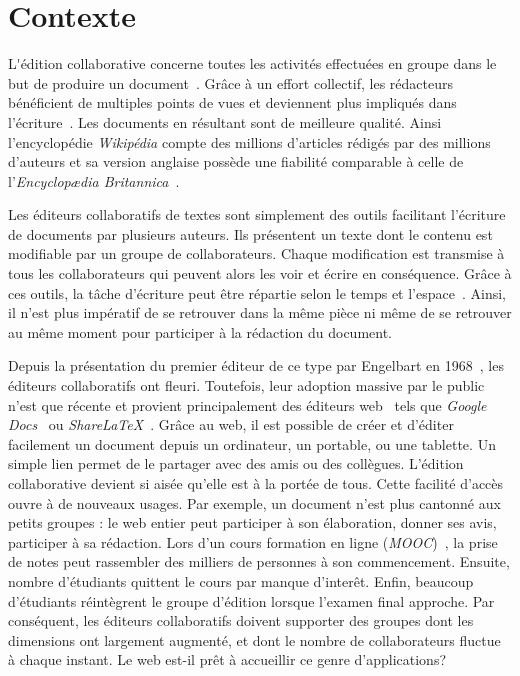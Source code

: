 
\section{Contexte}

\lettrine{L}'édition collaborative concerne toutes les activités effectuées en
groupe dans le but de produire un document~\cite{ellis1989concurrency,
  johansen1988groupware}. Grâce à un effort collectif, les rédacteurs
bénéficient de multiples points de vues et deviennent plus impliqués dans
l'écriture~\cite{noel2004empirical}. Les documents en résultant sont de
meilleure qualité. Ainsi l'encyclopédie \emph{Wikipédia} compte des millions
d'articles rédigés par des millions d'auteurs et sa version anglaise possède une
fiabilité comparable à celle de l'\emph{Encyclopædia
  Britannica}~\cite{giles2005internet}.

Les éditeurs collaboratifs de textes sont simplement des outils facilitant
l'écriture de documents par plusieurs auteurs. Ils présentent un texte dont le
contenu est modifiable par un groupe de collaborateurs. Chaque modification est
transmise à tous les collaborateurs qui peuvent alors les voir et écrire en
conséquence. Grâce à ces outils, la tâche d'écriture peut être répartie selon le
temps et l'espace~\cite{desanctis1987foundation, grudin1994computersupported,
  johansen1988groupware}. Ainsi, il n'est plus impératif de se retrouver dans la
même pièce ni même de se retrouver au même moment pour participer à la rédaction
du document.

Depuis la présentation du premier éditeur de ce type par Engelbart en
1968~\cite{engelbart1968research}, les éditeurs collaboratifs ont
fleuri. Toutefois, leur adoption massive par le public n'est que récente et
provient principalement des éditeurs web~\cite{mogan2010impact,
  perkel2014scientific} tels que \emph{Google Docs}~\cite{googledocs} ou
\emph{ShareLaTeX}~\cite{sharelatex}. Grâce au web, il est possible de créer et
d'éditer facilement un document depuis un ordinateur, un portable, ou une
tablette. Un simple lien permet de le partager avec des amis ou des
collègues. L'édition collaborative devient si aisée qu'elle est à la portée de
tous. Cette facilité d'accès ouvre à de nouveaux usages. Par exemple, un
document n'est plus cantonné aux petits groupes : le web entier peut participer
à son élaboration, donner ses avis, participer à sa rédaction. Lors d'un cours
formation en ligne (\emph{MOOC})~\cite{breslow2013studying}, la prise de notes
peut rassembler des milliers de personnes à son commencement. Ensuite, nombre
d'étudiants quittent le cours par manque d'interêt. Enfin, beaucoup d'étudiants
réintègrent le groupe d'édition lorsque l'examen final approche.  Par
conséquent, les éditeurs collaboratifs doivent supporter des groupes dont les
dimensions ont largement augmenté, et dont le nombre de collaborateurs fluctue à
chaque instant. Le web est-il prêt à accueillir ce genre d'applications?


